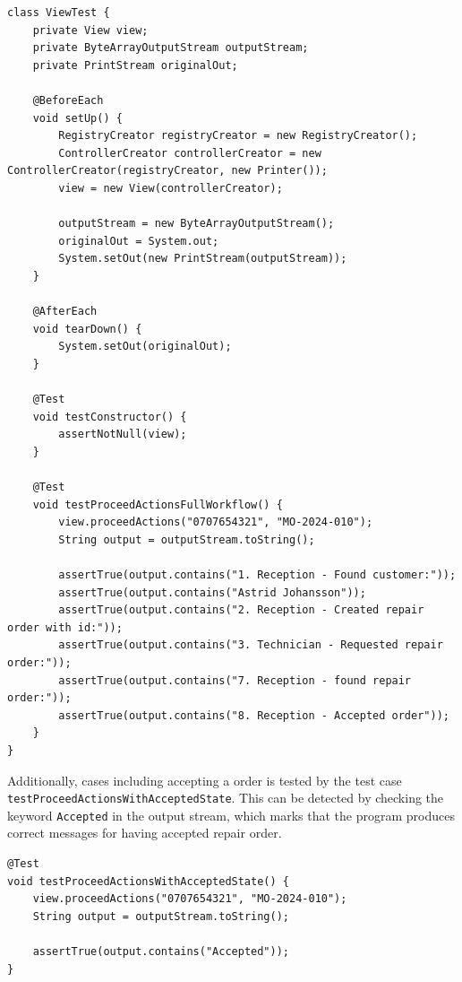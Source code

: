 \documentclass[a4paper]{scrartcl}
\begin{document}
\begin{lstlisting}[style=javastyle, caption={\texttt{ViewTest} setup and full workflow execution test capturing standard output}]
class ViewTest {
    private View view;
    private ByteArrayOutputStream outputStream;
    private PrintStream originalOut;

    @BeforeEach
    void setUp() {
        RegistryCreator registryCreator = new RegistryCreator();
        ControllerCreator controllerCreator = new ControllerCreator(registryCreator, new Printer());
        view = new View(controllerCreator);

        outputStream = new ByteArrayOutputStream();
        originalOut = System.out;
        System.setOut(new PrintStream(outputStream));
    }

    @AfterEach
    void tearDown() {
        System.setOut(originalOut);
    }

    @Test
    void testConstructor() {
        assertNotNull(view);
    }

    @Test
    void testProceedActionsFullWorkflow() {
        view.proceedActions("0707654321", "MO-2024-010");
        String output = outputStream.toString();

        assertTrue(output.contains("1. Reception - Found customer:"));
        assertTrue(output.contains("Astrid Johansson"));
        assertTrue(output.contains("2. Reception - Created repair order with id:"));
        assertTrue(output.contains("3. Technician - Requested repair order:"));
        assertTrue(output.contains("7. Reception - found repair order:"));
        assertTrue(output.contains("8. Reception - Accepted order"));
    }
}
\end{lstlisting}

Additionally, cases including accepting a order is tested by the test case \linebreak\texttt{testProceedActionsWithAcceptedState}. This can be detected by checking the keyword \texttt{Accepted} in the output stream, which marks that the program produces correct messages for having accepted repair order.

\begin{lstlisting}[style=javastyle, caption={Workflow test verifying accepted repair order output in \texttt{ViewTest}}]
@Test
void testProceedActionsWithAcceptedState() {
    view.proceedActions("0707654321", "MO-2024-010");
    String output = outputStream.toString();

    assertTrue(output.contains("Accepted"));
}
\end{lstlisting}
\end{document}
